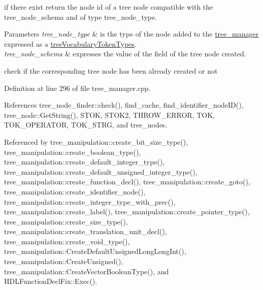 if there exist return the node id of a tree node compatible with the tree\+\_\+node\+\_\+schema and of type tree\+\_\+node\+\_\+type. 


\begin{DoxyParams}{Parameters}
{\em tree\+\_\+node\+\_\+type} & is the type of the node added to the \hyperlink{classtree__manager}{tree\+\_\+manager} expressed as a \hyperlink{structtreeVocabularyTokenTypes}{tree\+Vocabulary\+Token\+Types}. \\
\hline
{\em tree\+\_\+node\+\_\+schema} & expresses the value of the field of the tree node created. \\
\hline
\end{DoxyParams}
check if the corresponding tree node has been already created or not 

Definition at line 296 of file tree\+\_\+manager.\+cpp.



References tree\+\_\+node\+\_\+finder\+::check(), find\+\_\+cache, find\+\_\+identifier\+\_\+node\+I\+D(), tree\+\_\+node\+::\+Get\+String(), S\+T\+OK, S\+T\+O\+K2, T\+H\+R\+O\+W\+\_\+\+E\+R\+R\+OR, T\+OK, T\+O\+K\+\_\+\+O\+P\+E\+R\+A\+T\+OR, T\+O\+K\+\_\+\+S\+T\+RG, and tree\+\_\+nodes.



Referenced by tree\+\_\+manipulation\+::create\+\_\+bit\+\_\+size\+\_\+type(), tree\+\_\+manipulation\+::create\+\_\+boolean\+\_\+type(), tree\+\_\+manipulation\+::create\+\_\+default\+\_\+integer\+\_\+type(), tree\+\_\+manipulation\+::create\+\_\+default\+\_\+unsigned\+\_\+integer\+\_\+type(), tree\+\_\+manipulation\+::create\+\_\+function\+\_\+decl(), tree\+\_\+manipulation\+::create\+\_\+goto(), tree\+\_\+manipulation\+::create\+\_\+identifier\+\_\+node(), tree\+\_\+manipulation\+::create\+\_\+integer\+\_\+type\+\_\+with\+\_\+prec(), tree\+\_\+manipulation\+::create\+\_\+label(), tree\+\_\+manipulation\+::create\+\_\+pointer\+\_\+type(), tree\+\_\+manipulation\+::create\+\_\+size\+\_\+type(), tree\+\_\+manipulation\+::create\+\_\+translation\+\_\+unit\+\_\+decl(), tree\+\_\+manipulation\+::create\+\_\+void\+\_\+type(), tree\+\_\+manipulation\+::\+Create\+Default\+Unsigned\+Long\+Long\+Int(), tree\+\_\+manipulation\+::\+Create\+Unsigned(), tree\+\_\+manipulation\+::\+Create\+Vector\+Boolean\+Type(), and H\+D\+L\+Function\+Decl\+Fix\+::\+Exec().

